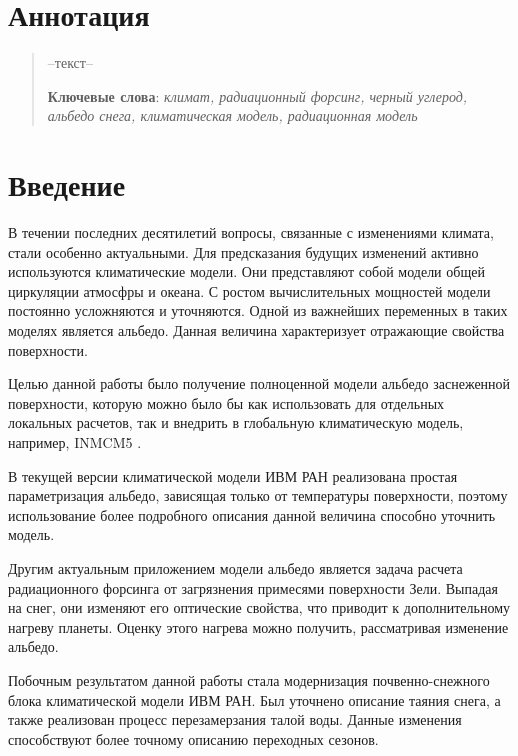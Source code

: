 \documentclass[a4paper, fontsize=14pt]{scrartcl}
\begin{document}
\section*{Аннотация}
\begin{abstract}

--текст-- 
  
  \bigskip
  \textbf{Ключевые слова}: \emph{климат, радиационный форсинг, черный углерод, альбедо снега, климатическая модель, радиационная модель}
\end{abstract}


\newpage
{}
{}
\tableofcontents


\newpage
\section*{Введение}

В течении последних десятилетий вопросы, связанные с изменениями климата, стали особенно актуальными. Для предсказания будущих изменений активно используются климатические модели. Они представляют собой модели общей циркуляции атмосфры и океана. С ростом вычислительных мощностей модели постоянно усложняются и уточняются. Одной из важнейших переменных в таких моделях является альбедо. Данная величина характеризует отражающие свойства поверхности.

Целью данной работы было получение полноценной модели альбедо заснеженной поверхности, которую можно было бы как использовать для отдельных локальных расчетов, так и внедрить в глобальную климатическую модель, например, INMCM5 \cite{Volodin2017}.  

В текущей версии климатической модели ИВМ РАН реализована простая параметризация альбедо, зависящая только от температуры поверхности, поэтому использование более подробного описания данной величина способно уточнить модель. 

Другим актуальным приложением модели альбедо является задача расчета радиационного форсинга от загрязнения примесями поверхности Зели. Выпадая на снег, они изменяют его оптические свойства, что приводит к дополнительному нагреву планеты. Оценку этого нагрева можно получить, рассматривая изменение альбедо. 

Побочным результатом данной работы стала модернизация почвенно-снежного блока климатической модели ИВМ РАН. Был уточнено описание таяния снега, а также реализован процесс перезамерзания талой воды. Данные изменения способствуют более точному описанию переходных сезонов.
\end{document}
